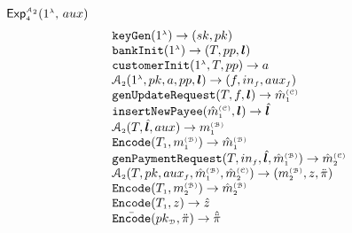 \begin{definition}[Privacy]
\begin{enumerate}[leftmargin=*]
\vspace{-1mm}
\begin{center}
{\small{
\begin{mybox}[colback=white,  width=78mm, height=65mm, left=-1mm, drop fuzzy shadow southwest]{$\mathsf{Exp}_{\st 4}^{\st\mathcal{A}_{\st 2}}(1^{\st\lambda}\text{, }  {aux})$}
\vspace{-.7mm}
$$
  \begin{array}{l}
%
 \mathtt{keyGen}(1^{\st\lambda})\rightarrow (sk,pk) \\
%
  \mathtt{bankInit}(1^{\st \lambda})\rightarrow (T, pp, \bm{l}) \\
%
\mathtt{customerInit} (1^{\st \lambda}, T, pp)\rightarrow a \\
%
\mathcal{A}_{\st 2}(1^{\st \lambda}, pk, a, pp, \bm{l})\rightarrow (f, in_{\st f}, {aux}_{\st f}) \\
%
\mathtt{genUpdateRequest}(T, f, {\bm l})\rightarrow \hat m^{\st\mathcal{(C)}}_{\st 1} \\
%
\mathtt{insertNewPayee}(\hat{m}^{\st\mathcal{(C)}}_{\st 1}, {\bm l})\rightarrow  \hat{\bm l} \\
%
\mathcal{A}_{\st 2}(T, \hat{\bm l}, {aux})\rightarrow  m^{\st\mathcal{(B)}}_{\st1} \\
%
\mathtt{Encode}(T_{\st 1}, m^{\st\mathcal{(B)}}_{\st1})\rightarrow \hat m^{\st\mathcal{(B)}}_{\st1} \\
%
\mathtt{genPaymentRequest}(T, in_{\st f}, \hat{\bm{l}}, \hat m^{\st\mathcal{(B)}}_{\st1})\rightarrow \hat m^{\st\mathcal{(C)}}_{\st2} \\
%
\mathcal{A}_{\st 2}(T,  pk, {aux}_{\st f}, \hat m^{\st\mathcal{(B)}}_{\st 1}, \hat m^{\st\mathcal{(C)}}_{\st2})\rightarrow ( m^{\st\mathcal{(B)}}_{\st2},  z, {\ddot \pi})\\
%
\mathtt{Encode}(T_{\st 1}, m^{\st\mathcal{(B)}}_{\st 2})\rightarrow \hat m^{\st\mathcal{(B)}}_{\st2} \\
%
\mathtt{Encode}(T_{\st 1},  z)\rightarrow \hat z \\
%
{\bar{ \mathtt{Encode}}}(pk_{\st\mathcal{D}}, \ddot \pi)\rightarrow  \hat{\ddot \pi} \\
%
%

\end{array}$$
\end{mybox}}}
\end{center}
\end{enumerate}
\end{definition}
